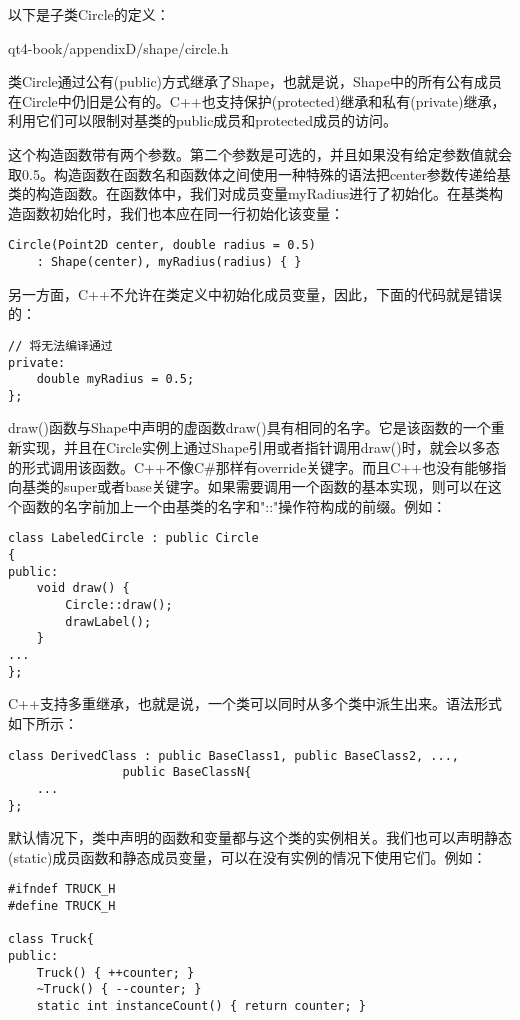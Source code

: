 \documentclass[11pt,oneside]{book}
\begin{document}
\begin{common-format}
以下是子类Circle的定义：

\begin{cppinput}{qt4-book/appendixD/shape/circle.h}
\end{cppinput}

类Circle通过公有(public)方式继承了Shape，也就是说，Shape中的所有公有成员在Circle中仍旧是公有的。C++也支持保护(protected)继承和私有(private)继承，利用它们可以限制对基类的public成员和protected成员的访问。

这个构造函数带有两个参数。第二个参数是可选的，并且如果没有给定参数值就会取0.5。构造函数在函数名和函数体之间使用一种特殊的语法把center参数传递给基类的构造函数。在函数体中，我们对成员变量myRadius进行了初始化。在基类构造函数初始化时，我们也本应在同一行初始化该变量：
\begin{Verbatim}
Circle(Point2D center, double radius = 0.5)
    : Shape(center), myRadius(radius) { }
\end{Verbatim}

另一方面，C++不允许在类定义中初始化成员变量，因此，下面的代码就是错误的：
\begin{Verbatim}
// 将无法编译通过
private:
    double myRadius = 0.5;
};
\end{Verbatim}

draw()函数与Shape中声明的虚函数draw()具有相同的名字。它是该函数的一个重新实现，并且在Circle实例上通过Shape引用或者指针调用draw()时，就会以多态的形式调用该函数。C++不像C\#{}那样有override关键字。而且C++也没有能够指向基类的super或者base关键字。如果需要调用一个函数的基本实现，则可以在这个函数的名字前加上一个由基类的名字和"::"操作符构成的前缀。例如：
\begin{Verbatim}
class LabeledCircle : public Circle
{
public:
    void draw() {
        Circle::draw();
        drawLabel();
    }
...
};
\end{Verbatim}


C++支持多重继承，也就是说，一个类可以同时从多个类中派生出来。语法形式如下所示：
\begin{Verbatim}
class DerivedClass : public BaseClass1, public BaseClass2, ...,
                public BaseClassN{
    ...
};
\end{Verbatim}

默认情况下，类中声明的函数和变量都与这个类的实例相关。我们也可以声明静态(static)成员函数和静态成员变量，可以在没有实例的情况下使用它们。例如：
\begin{Verbatim}
#ifndef TRUCK_H
#define TRUCK_H

class Truck{
public:
    Truck() { ++counter; }
    ~Truck() { --counter; }
    static int instanceCount() { return counter; }


\end{Verbatim}
\end{common-format}
\end{document}
